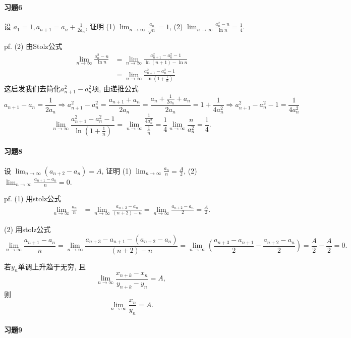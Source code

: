 \paragraph{习题6}

设 $a_{1}=1,a_{n+1}=a_{n}+\frac{1}{2a_{n}}$, 证明 (1) $\lim_{n\rightarrow\infty}\frac{a_{n}}{\sqrt{n}}=1$,
(2) $\lim_{n\rightarrow\infty}\frac{a_{n}^{2}-n}{\ln n}=\frac{1}{4}$.

pf. (2) 由Stolz公式
\begin{align*}
\lim_{n\to\infty}\frac{a_{n}^{2}-n}{\ln n} & =\lim_{n\to\infty}\frac{a_{n+1}^{2}-a_{n}^{2}-1}{\ln(n+1)-\ln n}\\
 & =\lim_{n\to\infty}\frac{a_{n+1}^{2}-a_{n}^{2}-1}{\ln\left(1+\frac{1}{n}\right)}
\end{align*}
这启发我们去简化$a_{n+1}^{2}-a_{n}^{2}$项, 由递推公式
\[
a_{n+1}-a_{n}=\frac{1}{2a_{n}}\Longrightarrow a_{n+1}^{2}-a_{n}^{2}=\frac{a_{n+1}+a_{n}}{2a_{n}}=\frac{a_{n}+\frac{1}{2a_{n}}+a_{n}}{2a_{n}}=1+\frac{1}{4a_{n}^{2}}\Longrightarrow a_{n+1}^{2}-a_{n}^{2}-1=\frac{1}{4a_{n}^{2}}
\]
\[
\lim_{n\to\infty}\frac{a_{n+1}^{2}-a_{n}^{2}-1}{\ln\left(1+\frac{1}{n}\right)}=\lim_{n\to\infty}\frac{\frac{1}{4a_{n}^{2}}}{\frac{1}{n}}=\frac{1}{4}\lim_{n\to\infty}\frac{n}{a_{n}^{2}}=\frac{1}{4}.
\]


\paragraph{习题8}

设 $\lim_{n\rightarrow\infty}\left(a_{n+2}-a_{n}\right)=A$, 证明 (1)
$\lim_{n\rightarrow\infty}\frac{a_{n}}{n}=\frac{A}{2}$, (2) $\lim_{n\rightarrow\infty}\frac{a_{n+1}-a_{n}}{n}=0$.

pf. (1) 用stolz公式
\begin{align*}
\lim_{n\to\infty}\frac{a_{n}}{n} & =\lim_{n\to\infty}\frac{a_{n+2}-a_{n}}{(n+2)-n}=\lim_{n\to\infty}\frac{a_{n+2}-a_{n}}{2}=\frac{A}{2}.
\end{align*}

(2) 用stolz公式
\[
\lim_{n\to\infty}\frac{a_{n+1}-a_{n}}{n}=\lim_{n\to\infty}\frac{a_{n+3}-a_{n+1}-(a_{n+2}-a_{n})}{(n+2)-n}=\lim_{n\to\infty}\left(\frac{a_{n+3}-a_{n+1}}{2}-\frac{a_{n+2}-a_{n}}{2}\right)=\frac{A}{2}-\frac{A}{2}=0.
\]

若$y_{n}$单调上升趋于无穷, 且
\[
\lim_{n\to\infty}\frac{x_{n+k}-x_{n}}{y_{n+k}-y_{n}}=A,
\]
则
\[
\lim_{n\to\infty}\frac{x_{n}}{y_{n}}=A.
\]


\paragraph{习题9}

